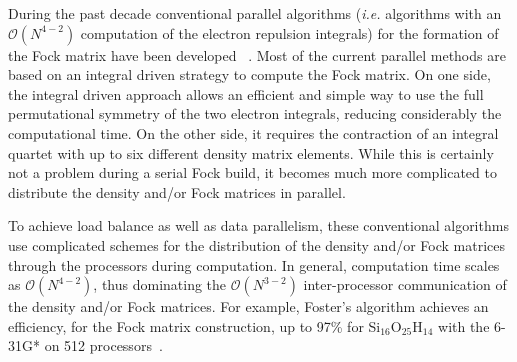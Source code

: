 \documentclass[prl,twocolumn,twocolumngrid,superbib]{revtex4} %
\begin{document}
 During the past decade conventional parallel algorithms 
 ({\em i.e.} algorithms with an $\mathcal{O}(N^{4-2})$ computation 
 of the electron repulsion integrals) for the 
 formation of the Fock matrix have been developed
 ~\cite{MColvin93,TFurlani95,IFoster96,RHarrison96,YAlexeev02,HTakashima02,RLindh03}.
 Most of the current parallel methods are based on an integral driven strategy
 to compute the Fock matrix. On one side, the integral driven approach
 allows an efficient and simple way to use the full permutational symmetry
 of the two electron integrals, reducing considerably the computational time. 
 On the other side, it requires the contraction of an integral quartet with up to six 
 different density matrix elements.
 While this is certainly not a problem during a serial Fock build, it becomes
 much more complicated to distribute the density and/or Fock matrices in parallel.

 To achieve load balance as well as data parallelism, 
 these conventional algorithms use complicated schemes for the 
 distribution of the density and/or Fock 
 matrices through the processors during computation.
 In general, computation time scales as $\mathcal{O}(N^{4-2})$, thus dominating
 the $\mathcal{O}(N^{3-2})$ inter-processor 
 communication of the density and/or Fock matrices.
 For example, Foster's algorithm achieves an efficiency, for the 
 Fock matrix construction, up to 97\% for Si$_{16}$O$_{25}$H$_{14}$ with 
 the 6-31G* on 512 processors~\cite{RHarrison96}.





\end{document}
